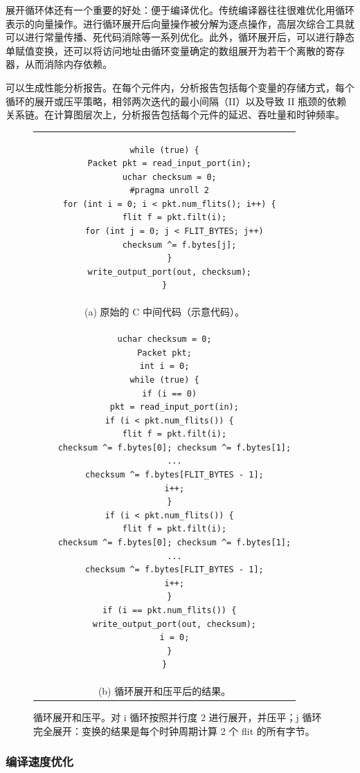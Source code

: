 展开循环体还有一个重要的好处：便于编译优化。传统编译器往往很难优化用循环表示的向量操作。\name 进行循环展开后向量操作被分解为逐点操作，高层次综合工具就可以进行常量传播、死代码消除等一系列优化。此外，循环展开后，\name 可以进行静态单赋值变换，还可以将访问地址由循环变量确定的数组展开为若干个离散的寄存器，从而消除内存依赖。

\name 可以生成性能分析报告。在每个元件内，分析报告包括每个变量的存储方式，每个循环的展开或压平策略，相邻两次迭代的最小间隔（II）以及导致 II 瓶颈的依赖关系链。在计算图层次上，分析报告包括每个元件的延迟、吞吐量和时钟频率。

\begin{figure}
	\lstset{style=numbers}
	
	\centering
	\renewcommand{\baselinestretch}{0.75}
	\begin{tabular}{c}
		{
			\small
\begin{lstlisting}[escapechar=@]
while (true) {
  Packet pkt = read_input_port(in);
  uchar checksum = 0;
  #pragma unroll 2
  for (int i = 0; i < pkt.num_flits(); i++) {
    flit f = pkt.filt(i);
    for (int j = 0; j < FLIT_BYTES; j++)
      checksum ^= f.bytes[j];
  }
  write_output_port(out, checksum);
}
\end{lstlisting} 
		} \\
		(a) 原始的 C 中间代码（示意代码）。  \\
		{
			\small 
\begin{lstlisting}[escapechar=@]
uchar checksum = 0;
Packet pkt;
int i = 0;
while (true) {
  if (i == 0)
    pkt = read_input_port(in);
  if (i < pkt.num_flits()) {
    flit f = pkt.filt(i);
    checksum ^= f.bytes[0]; checksum ^= f.bytes[1];
    ...
    checksum ^= f.bytes[FLIT_BYTES - 1];
    i++;
  }
  if (i < pkt.num_flits()) {
    flit f = pkt.filt(i);
    checksum ^= f.bytes[0]; checksum ^= f.bytes[1];
    ...
    checksum ^= f.bytes[FLIT_BYTES - 1];
    i++;
  }
  if (i == pkt.num_flits()) {
    write_output_port(out, checksum);
    i = 0;
  }
}
\end{lstlisting} 
		} \\
		(b) 循环展开和压平后的结果。
	\end{tabular}
	\caption{循环展开和压平。对 i 循环按照并行度 2 进行展开，并压平；j 循环完全展开：变换的结果是每个时钟周期计算 2 个 flit 的所有字节。}
	\label{clicknp:fig:flatten}
\end{figure}

\subsubsection{编译速度优化}

